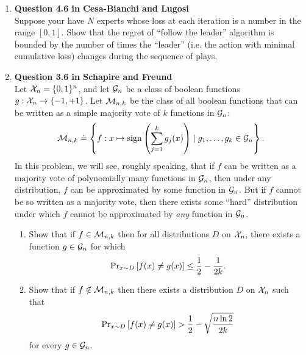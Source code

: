 \documentclass{article}[12pt]
\begin{document}
\begin{enumerate}
\pagebreak
\item
  {\bf Question 4.6 in Cesa-Bianchi and Lugosi}\\
  Suppose your have $N$ experts whose loss at each iteration is a
  number in the range $[0,1]$. Show that the regret of ``follow the
  leader'' algorithm is bounded by the number of times the ``leader''
  (i.e. the action with minimal cumulative loss) changes during the
  sequence of plays.

\newcommand{\X}{{\cal X}}      %
\newcommand{\Mnk}{{\cal M}_{n,k}}
\newcommand{\Gn}{{\cal G}_{n}}
\newcommand{\braces}[1]{\left\{{#1}\right\}}
\newcommand{\paren}[1]{\left({#1}\right)}
\newcommand{\brackets}[1]{\left[{#1}\right]}
\newcommand{\sign}{{\rm sign}}
\newcommand{\pr}[2]{{\rm Pr}_{#1}\brackets{#2}} %

\pagebreak
\item {\bf Question 3.6 in Schapire and Freund}\\
Let $\X_n=\{0,1\}^n$, and let $\Gn$ be a class of boolean functions
$g:\X_n\rightarrow\{-1,+1\}$.
Let $\Mnk$ be the class of all boolean functions that can be written
as a simple majority vote of $k$ functions in $\Gn$:
\[
  \Mnk \doteq \braces{f: x\mapsto \sign\paren{\sum_{j=1}^k g_j(x)}
                      \mid
                      g_1,\ldots,g_k\in \Gn}.
\]
In this problem, we will see, roughly speaking, that if $f$ can be
written as a majority vote of polynomially many functions in $\Gn$,
then under any distribution, $f$ can be approximated by some function
in $\Gn$.
But if $f$ cannot be so written as a majority vote, then there exists
some ``hard'' distribution under which $f$ cannot be approximated by
{\em any\/} function in $\Gn$.

\begin{enumerate}
\item
Show that if $f\in\Mnk$ then for all distributions $D$ on $\X_n$,
there exists a function $g\in\Gn$ for which
\[  \pr{x\sim D}{f(x)\neq g(x)} \leq \frac{1}{2} - \frac{1}{2k}. \]
\item
Show that if $f\not\in\Mnk$ then there exists a distribution $D$ on
$\X_n$ such that
\[
  \pr{x\sim D}{f(x)\neq g(x)} 
             > \frac{1}{2} - \sqrt{\frac{n\ln 2}{2k}}
\]
for every $g\in\Gn$.
\end{enumerate}

\end{enumerate}
\end{document}
